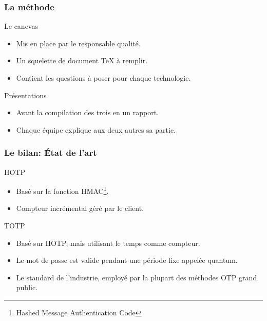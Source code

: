 \documentclass[xcolor=table]{beamer}
\begin{document}
\begin{frame}
\frametitle{La méthode}
\begin{block}{Le canevas}
\begin{itemize}
\item Mis en place par le responsable qualité.
\item Un squelette de document TeX à remplir.
\item Contient les questions à poser pour chaque technologie.
\end{itemize}
\end{block}
\begin{block}{Présentations}
\begin{itemize}
\item Avant la compilation des trois en un rapport.
\item Chaque équipe explique aux deux autres sa partie.
\end{itemize}
\end{block}
\end{frame}

\begin{frame}
\frametitle{Le bilan: État de l'art}
\begin{block}{HOTP}
\begin{itemize}
\item Basé sur la fonction HMAC\footnote{Hashed Message Authentication Code}.
\item Compteur incrémental géré par le client.
\end{itemize}
\end{block}

\begin{block}{TOTP}
\begin{itemize}
\item Basé sur HOTP, mais utilisant le temps comme compteur.
\item Le mot de passe est valide pendant une période fixe appelée quantum.
\item Le standard de l'industrie, employé par la plupart des méthodes OTP grand public.
\end{itemize}

\end{block}
\end{frame}
\end{document}
